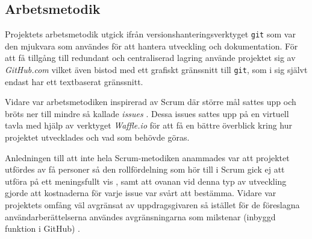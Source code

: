 
    \newpage

    \subsection{Arbetsmetodik} %
    \label{sub:arbetsmetodik}
        Projektets arbetsmetodik utgick ifrån versionshanteringsverktyget \texttt{git} 
        som var den mjukvara som användes för att hantera utveckling och dokumentation. För att få tillgång 
        till redundant och centraliserad lagring använde projektet sig av \textit{GitHub.com} vilket även bistod med ett grafiskt gränssnitt till \texttt{git}, som i sig självt endast har ett textbaserat gränssnitt. \bigskip

        Vidare var arbetsmetodiken inspirerad av Scrum där större mål sattes upp och bröts ner till mindre så kallade \textit{issues} \cite[kap.~8]{scrum}. Dessa issues sattes upp på en virtuell tavla med hjälp av verktyget \textit{Waffle.io} för att få en bättre överblick kring hur projektet utvecklades och vad som behövde göras. \bigskip

        Anledningen till att inte hela Scrum-metodiken anammades var att projektet utfördes av få personer så den rollfördelning som hör till i Scrum gick ej att utföra på ett meningsfullt vis \cite[kap.~6]{scrum}, samt att ovanan vid denna typ av utveckling gjorde att kostnaderna för varje issue var svårt att bestämma. Vidare var projektets omfång väl avgränsat av uppdrags\-givaren så istället för de föreslagna användarberättelserna användes avgränsningarna som milstenar (inbyggd funktion i GitHub) \cite[kap.~9]{scrum}.

